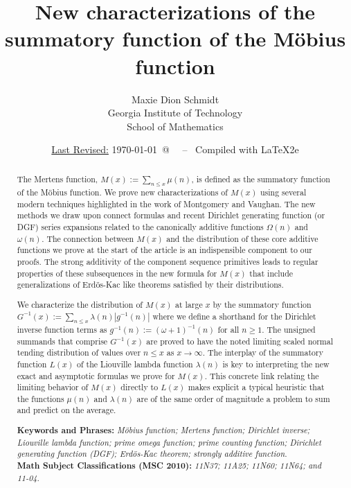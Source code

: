 \documentclass[11pt,reqno,a4letter]{article}
\title{
       \LARGE{
       New characterizations of the summatory function of the M\"obius function 
       } 
}
\author{{\Large Maxie Dion Schmidt} \\ 
        {\normalsize Georgia Institute of Technology} \\[0.025cm] 
        {\normalsize School of Mathematics} 
}
\date{\small\underline{Last Revised:} \today \ @\ \hhmmsstime{} \ -- \ Compiled with \LaTeX2e}
\numberwithin{figure}{section}
\numberwithin{table}{section}
\theoremstyle{plain}
\numberwithin{theorem}{section}
\theoremstyle{definition}
\begin{document}
 

\maketitle

\begin{abstract} 
The Mertens function, $M(x) := \sum_{n \leq x} \mu(n)$, is 
defined as the summatory function of the M\"obius function. 
We prove new characterizations of $M(x)$ using several modern 
techniques highlighted in the work of Montgomery and Vaughan. 
The new methods we draw upon connect formulas and recent 
Dirichlet generating function (or DGF) series expansions related to the canonically 
additive functions $\Omega(n)$ and $\omega(n)$. 
The connection between $M(x)$ and the distribution of these core additive functions 
we prove at the start of the article is an indispensible component to our proofs. 
The strong additivity of the component sequence primitives leads to 
regular properties of these subsequences in the new formula for $M(x)$ that include 
generalizations of Erd\"os-Kac like theorems satisfied by their distributions. 

We characterize the distribution of $M(x)$ at large $x$ by the 
summatory function $G^{-1}(x) := \sum_{n \leq x} \lambda(n) |g^{-1}(n)|$ 
where we define a shorthand for the Dirichlet inverse function terms as 
$g^{-1}(n) := (\omega+1)^{-1}(n)$ for all $n \geq 1$. 
The unsigned summands that comprise $G^{-1}(x)$ are proved to have the noted limiting scaled 
normal tending distribution of values over $n \leq x$ as $x \rightarrow \infty$. 
The interplay of the summatory function $L(x)$ of the Liouville lambda function $\lambda(n)$ 
is key to interpreting the new exact and asymptotic formulas we prove for $M(x)$. 
This concrete link relating the limiting behavior of $M(x)$ directly to $L(x)$ makes explicit 
a typical heuristic that the functions $\mu(n)$ and $\lambda(n)$ are 
of the same order of magnitude a problem to sum and predict on the average. 

\bigskip 
\noindent
\textbf{Keywords and Phrases:} {\it M\"obius function; Mertens function; 
                                    Dirichlet inverse; Liouville lambda function; prime omega function; 
                                    prime counting function; Dirichlet generating function (DGF); 
                                    Erd\"os-Kac theorem; strongly additive function. } \\ 
\textbf{Math Subject Classifications (MSC 2010):} {\it 11N37; 11A25; 11N60; 11N64; and 11-04. } 
\end{abstract} 
\end{document}
